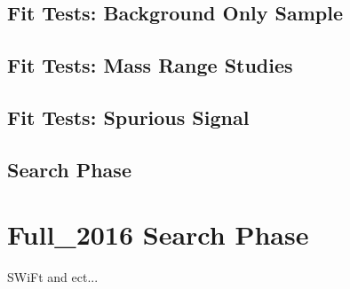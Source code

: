 \subsection{Fit Tests: Background Only Sample}
\label{sec:bkg-summer_fitCR}

\subsection{Fit Tests: Mass Range Studies}
\label{sec:bkg-summer_range}

\subsection{Fit Tests: Spurious Signal}
\label{sec:bkg-summer_spusig}

\subsection{Search Phase}
\label{sec:bkg-summer_results}

\section{Full\_2016 Search Phase}
\label{sec:bkg-full}

SWiFt and ect...
